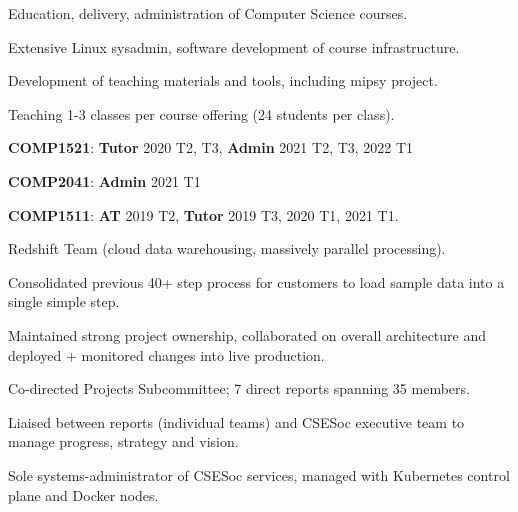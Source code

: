 \documentclass[a4paper]{deedy-resume}
\begin{document}
\begin{minipage}[t]{0.63\textwidth}
\begin{tightitemize}
\item Education, delivery, administration of Computer Science courses.
\item Extensive Linux sysadmin,
	  software development of course infrastructure.
\item Development of teaching materials and tools,
	  including mipsy project.
\item Teaching 1-3 classes per course offering (24 students per class).
\item \textbf{COMP1521}: \textbf{Tutor} 2020 T2, T3,
						 \textbf{Admin} 2021 T2, T3, 2022 T1
\item \textbf{COMP2041}: \textbf{Admin} 2021 T1
\item \textbf{COMP1511}: \textbf{AT}    2019 T2,
						 \textbf{Tutor} 2019 T3, 2020 T1, 2021 T1.
\end{tightitemize}

\sectionspace



\begin{tightitemize}
\item Redshift Team (cloud data warehousing, massively parallel processing).
\item Consolidated previous 40+ step process for customers
	  to load sample data into a single simple step.
\item Maintained strong project ownership, collaborated
	  on overall architecture and deployed + monitored changes
	  into live production.
\end{tightitemize}

\sectionspace



\begin{tightitemize}
\item Co-directed Projects Subcommittee;
	  7 direct reports spanning 35 members.
\item Liaised between reports (individual teams) and
	  CSESoc executive team to manage progress,
	  strategy and vision.
\item Sole systems-administrator of CSESoc services,
	  managed with Kubernetes control plane and
	  Docker nodes.
\end{tightitemize}


\end{minipage}
\end{document}
